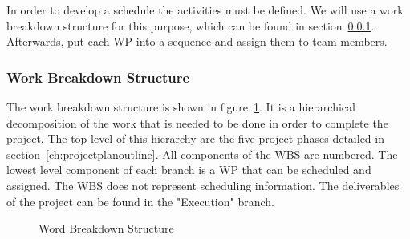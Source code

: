 In order to develop a schedule the activities must be defined. We will use a work breakdown structure for this purpose, which can be found in section~\ref{ch:wbs}. Afterwards, put each \ac{WP} into a sequence and assign them to team members.

\subsubsection{Work Breakdown Structure}
\label{ch:wbs}

The work breakdown structure is shown in figure~\ref{fig:wbs}. It is a hierarchical decomposition of the work that is needed to be done in order to complete the project. The top level of this hierarchy are the five project phases detailed in section~\ref{ch:projectplanoutline}. All components of the \ac{WBS} are numbered. The lowest level component of each branch is a \ac{WP} that can be scheduled and assigned. The \ac{WBS} does not represent scheduling information. The deliverables of the project can be found in the "Execution" branch.

\begin{figure}
  \caption{Word Breakdown Structure}
  \label{fig:wbs}
\end{figure}


